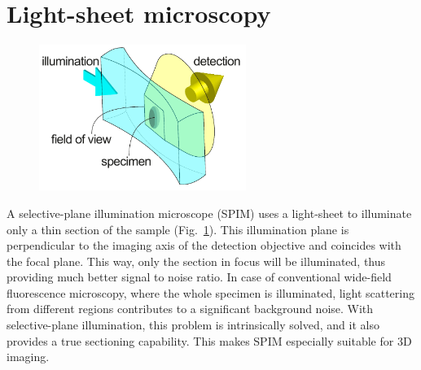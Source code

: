     




\section{Light-sheet microscopy}
  \label{sec:light-sheet}
  \begin{figure}[bt]
    \centering
    \includegraphics[width=0.6\textwidth]{spim_concept}
    \label{fig:spim_concept}
  \end{figure}

  A selective-plane illumination microscope (SPIM) uses a light-sheet to illuminate only a thin section of the sample (Fig.~\ref{fig:spim_concept}). This illumination plane is perpendicular to the imaging axis of the detection objective and coincides with the focal plane. This way, only the section in focus will be illuminated, thus providing much better signal to noise ratio. In case of conventional wide-field fluorescence microscopy, where the whole specimen is illuminated, light scattering from different regions contributes to a significant background noise. With selective-plane illumination, this problem is intrinsically solved, and it also provides a true sectioning capability. This makes SPIM especially suitable for 3D imaging.

